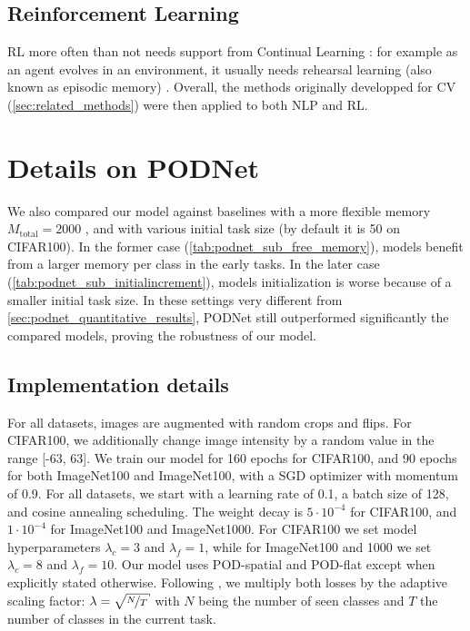 \subsection{Reinforcement Learning}
\label{sec:related_rl}


\ac{RL} \citep{sutton1998rl} more often than not needs support from Continual Learning
\citep{khetarpal2020continualrl}: for example as an agent evolves in an environment, it usually
needs rehearsal learning (also known as episodic memory) \citep{mnih2013atarirl}. Overall, the
methods originally developped for \ac{CV} (\autoref{sec:related_methods}) were then applied to both
\ac{NLP} and \ac{RL}.


\section{Details on PODNet}
\label{sec:appendix_podnet}

We also compared our model against baselines with a more flexible memory $M_{\text{total}} = 2000$
\citep{rebuffi2017icarl,wu2019bias_correction}, and with various initial task size (by default it is
50 on CIFAR100). In the former case (\autoref{tab:podnet_sub_free_memory}), models benefit from a
larger memory per class in the early tasks. In the later case
(\autoref{tab:podnet_sub_initialincrement}), models initialization is worse because of a smaller
initial task size. In these settings very different from \autoref{sec:podnet_quantitative_results},
\ac{PODNet} still outperformed significantly the compared models, proving the robustness of our
model.




\subsection{Implementation details}

For all datasets, images are augmented with random crops and flips. For CIFAR100, we additionally
change image intensity by a random value in the range [-63, 63].
%
We train our model for 160 epochs for CIFAR100, and 90 epochs for both ImageNet100 and ImageNet100,
with a SGD optimizer with momentum of 0.9. For all datasets, we start with a learning rate of 0.1, a
batch size of 128, and cosine annealing scheduling.
%
The weight decay is $5\cdot 10^{-4}$ for CIFAR100, and $1\cdot 10^{-4}$ for ImageNet100 and
ImageNet1000. For CIFAR100 we set model hyperparameters $\lambda_c = 3$ and $\lambda_f=1$, while for
ImageNet100 and 1000 we set $\lambda_c = 8$ and $\lambda_f =10$. Our model uses POD-spatial and
POD-flat except when explicitly stated otherwise. Following \citet{hou2019ucir}, we multiply both
losses by the adaptive scaling factor: $\lambda=\sqrt{\nicefrac{N}{T}}$ with $N$ being the number of
seen classes and $T$ the number of classes in the current task.

